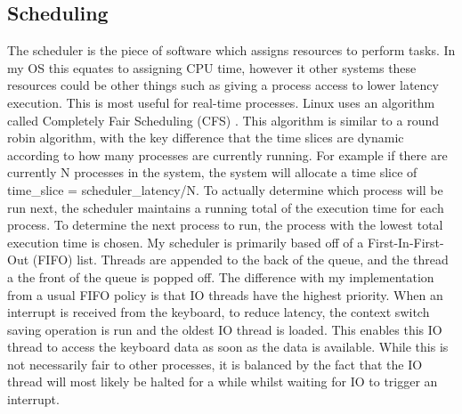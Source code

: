 \subsection{Scheduling}
The scheduler is the piece of software which assigns resources to perform tasks. In my OS this equates to assigning CPU time, however it other systems these resources could be other things such as giving a process access to lower latency execution. This is most useful for real-time processes. Linux uses an algorithm called Completely Fair Scheduling (CFS) \cite{CFS}. This algorithm is similar to a round robin algorithm, with the key difference that the time slices are dynamic according to how many processes are currently running. For example if there are currently N processes in the system, the system will allocate a time slice of time\_slice = scheduler\_latency/N. To actually determine which process will be run next, the scheduler maintains a running total of the execution time for each process. To determine the next process to run, the process with the lowest total execution time is chosen. 
My scheduler is primarily based off of a First-In-First-Out (FIFO) list. Threads are appended to the back of the queue, and the thread a the front of the queue is popped off. The difference with my implementation from a usual FIFO policy is that IO threads have the highest priority. When an interrupt is received from the keyboard, to reduce latency, the context switch saving operation is run and the oldest IO thread is loaded. This enables this IO thread to access the keyboard data as soon as the data is available. While this is not necessarily fair to other processes, it is balanced by the fact that the IO thread will most likely be halted for a while whilst waiting for IO to trigger an interrupt. 

